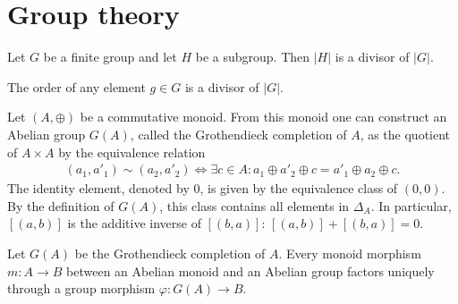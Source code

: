 \section{Group theory}\label{section:groups}



    \begin{theorem}[Lagrange]
        Let $G$ be a finite group and let $H$ be a subgroup. Then $|H|$ is a divisor of $|G|$.
    \end{theorem}
    \begin{result}
        The order of any element $g\in G$ is a divisor of $|G|$.
    \end{result}

    \begin{construct}\label{group:grothendieck_completion}
        Let $(A,\oplus)$ be a commutative monoid. From this monoid one can construct an Abelian group $G(A)$, called the Grothendieck completion of $A$, as the quotient of $A\times A$ by the equivalence relation
        \begin{gather}
            (a_1,a'_1)\sim (a_2,a'_2)\iff\exists c\in A:a_1\oplus a'_2\oplus c = a'_1\oplus a_2\oplus c.
        \end{gather}
        The identity element, denoted by 0, is given by the equivalence class of $(0,0)$. By the definition of $G(A)$, this class contains all elements in $\Delta_A$. In particular, $[(a,b)]$ is the additive inverse of $[(b,a)]$: $[(a,b)] + [(b,a)] = 0$.
    \end{construct}
    \begin{uproperty}
        Let $G(A)$ be the Grothendieck completion of $A$. Every monoid morphism $m:A\rightarrow B$ between an Abelian monoid and an Abelian group factors uniquely through a group morphism $\varphi:G(A)\rightarrow B$.
    \end{uproperty}

